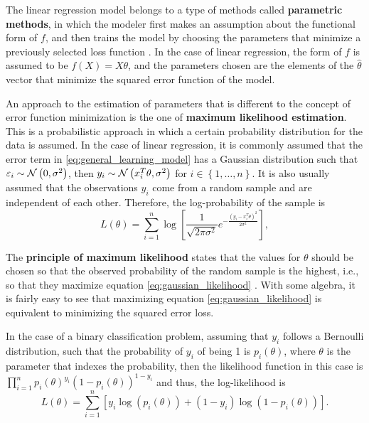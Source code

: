 The linear regression model belongs to a type of methods called \textbf{parametric methods}, in which the modeler first makes an assumption about the functional form of $f$, and then trains the model by choosing the parameters that minimize a previously selected loss function \cite[p.~21]{james2013introduction}. In the case of linear regression, the form of $f$ is assumed to be $f(X) = X\theta$, and the parameters chosen are the elements of the $\hat{\theta}$ vector that minimize the squared error function of the model.

An approach to the estimation of parameters that is different to the concept of error function minimization is the one of \textbf{maximum likelihood estimation}.
This is a probabilistic approach in which a certain probability distribution for the data is assumed.
In the case of linear regression, it is commonly assumed that the error term in \eqref{eq:general_learning_model} has a Gaussian distribution such that $\varepsilon_i \sim \mathcal{N}\left( 0, \sigma^2 \right)$, then $y_i \sim \mathcal{N}\left( x_i^T \theta, \sigma^2 \right)$ for $i \in \left\{ 1, \ldots, n \right\}$. It is also usually assumed that the observations $y_i$ come from a random sample and are independent of each other. Therefore, the log-probability of the sample is
\begin{equation}
  \label{eq:gaussian_likelihood}
  L(\theta) = \sum_{i = 1}^n \log \left[ \frac{1}{\sqrt{2 \pi \sigma^2}} e^{- \frac{(y_i - x_i^T \theta)^2}{2\sigma^2}} \right],
\end{equation}

The \textbf{principle of maximum likelihood} states that the values for $\theta$ should be chosen so that the observed probability of the random sample is the highest, i.e., so that they maximize equation \eqref{eq:gaussian_likelihood} \cite[p.~31]{friedman2001elements} \cite[p.~303]{roussas1973first}.
With some algebra, it is fairly easy to see that maximizing equation \eqref{eq:gaussian_likelihood} is equivalent to minimizing the squared error loss.

In the case of a binary classification problem, assuming that $y_i$ follows a Bernoulli distribution, such that the probability of $y_i$ of being 1 is $p_i(\theta)$, where $\theta$ is the parameter that indexes the probability, then the likelihood function in this case is $\prod_{i = 1}^n  p_i(\theta)^{y_i}\left(1 - p_i(\theta) \right)^{1 - y_i}$ and thus, the log-likelihood is
\begin{equation}
  L(\theta) = \sum_{i = 1}^n \left[ y_i \log\left( p_i(\theta) \right) + (1 - y_i) \log \left( 1 - p_i(\theta) \right) \right].
\end{equation}

